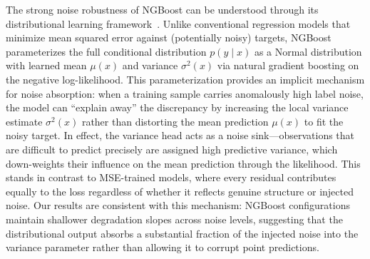 


The strong noise robustness of NGBoost can be understood through its
distributional learning framework~\citep{duan2020ngboost}. Unlike conventional
regression models that minimize mean squared error against (potentially noisy)
targets, NGBoost parameterizes the full conditional distribution $p(y \mid x)$
as a Normal distribution with learned mean $\mu(x)$ and variance $\sigma^2(x)$
via natural gradient boosting on the negative log-likelihood. This
parameterization provides an implicit mechanism for noise absorption: when a
training sample carries anomalously high label noise, the model can ``explain
away'' the discrepancy by increasing the local variance estimate $\sigma^2(x)$
rather than distorting the mean prediction $\mu(x)$ to fit the noisy target. In
effect, the variance head acts as a noise sink---observations that are difficult
to predict precisely are assigned high predictive variance, which down-weights
their influence on the mean prediction through the likelihood. This stands in
contrast to MSE-trained models, where every residual contributes equally to the
loss regardless of whether it reflects genuine structure or injected noise. Our
results are consistent with this mechanism: NGBoost configurations maintain
shallower degradation slopes across noise levels, suggesting that the
distributional output absorbs a substantial fraction of the injected noise into
the variance parameter rather than allowing it to corrupt point predictions.



